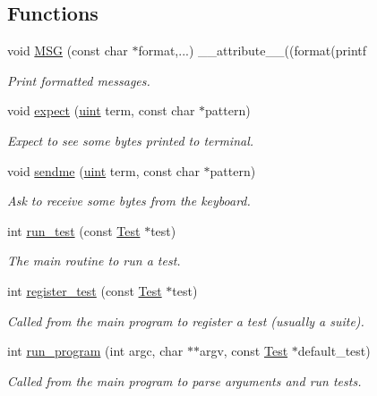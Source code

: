 \subsection*{Functions}
\begin{DoxyCompactItemize}
\item 
void \hyperlink{group__Testing_ga2e36933a48fbca44bb782f881ddceb20}{M\+SG} (const char $\ast$format,...) \+\_\+\+\_\+attribute\+\_\+\+\_\+((format(printf
\begin{DoxyCompactList}\small\item\em Print formatted messages. \end{DoxyCompactList}\item 
void \hyperlink{group__Testing_ga0c4e801b8c3317b802fa4e80e1e26de2}{expect} (\hyperlink{bios_8h_a91ad9478d81a7aaf2593e8d9c3d06a14}{uint} term, const char $\ast$pattern)
\begin{DoxyCompactList}\small\item\em Expect to see some bytes printed to terminal. \end{DoxyCompactList}\item 
void \hyperlink{group__Testing_ga0f97d30c4cd1370bcac6d7f4775d6789}{sendme} (\hyperlink{bios_8h_a91ad9478d81a7aaf2593e8d9c3d06a14}{uint} term, const char $\ast$pattern)
\begin{DoxyCompactList}\small\item\em Ask to receive some bytes from the keyboard. \end{DoxyCompactList}\item 
int \hyperlink{group__Testing_gac023795199b4f577a9181ac45e62b170}{run\+\_\+test} (const \hyperlink{structTest}{Test} $\ast$test)
\begin{DoxyCompactList}\small\item\em The main routine to run a test. \end{DoxyCompactList}\item 
int \hyperlink{group__Testing_ga4663cf3fb390b2a6d9cf1943f21b9934}{register\+\_\+test} (const \hyperlink{structTest}{Test} $\ast$test)
\begin{DoxyCompactList}\small\item\em Called from the main program to register a test (usually a suite). \end{DoxyCompactList}\item 
int \hyperlink{group__Testing_ga91dbdb97056588b088b689582abc2382}{run\+\_\+program} (int argc, char $\ast$$\ast$argv, const \hyperlink{structTest}{Test} $\ast$default\+\_\+test)
\begin{DoxyCompactList}\small\item\em Called from the main program to parse arguments and run tests. \end{DoxyCompactList}\end{DoxyCompactItemize}
